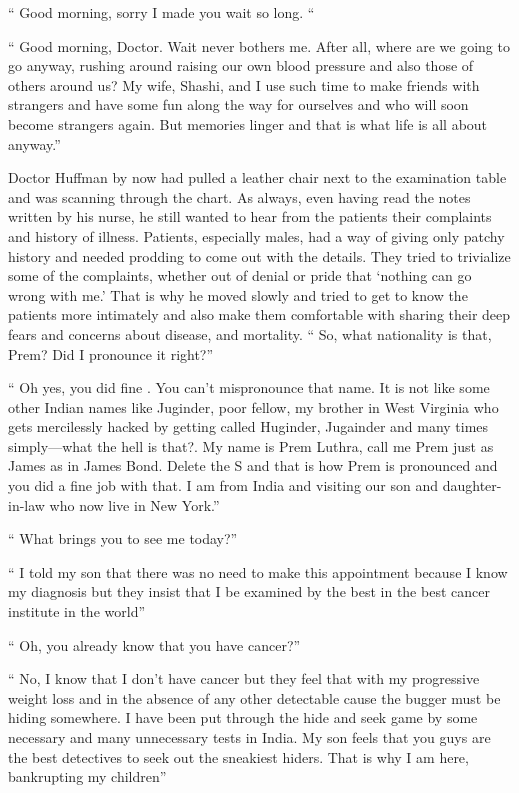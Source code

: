 `` Good morning, sorry I made you wait so long. ``

`` Good morning, Doctor. Wait never bothers me. After all, where are we
going to go anyway, rushing around raising our own blood pressure and
also those of others around us? My wife, Shashi, and I use such time to
make friends with strangers and have some fun along the way for
ourselves and who will soon become strangers again. But memories linger
and that is what life is all about anyway.''

Doctor Huffman by now had pulled a leather chair next to the examination
table and was scanning through the chart. As always, even having read
the notes written by his nurse, he still wanted to hear from the
patients their complaints and history of illness. Patients, especially
males, had a way of giving only patchy history and needed prodding to
come out with the details. They tried to trivialize some of the
complaints, whether out of denial or pride that `nothing can go wrong
with me.' That is why he moved slowly and tried to get to know the
patients more intimately and also make them comfortable with sharing
their deep fears and concerns about disease, and mortality. `` So, what
nationality is that, Prem? Did I pronounce it right?''

`` Oh yes, you did fine . You can't mispronounce that name. It is not
like some other Indian names like Juginder, poor fellow, my brother in
West Virginia who gets mercilessly hacked by getting called Huginder,
Jugainder and many times simply---what the hell is that?. My name is
Prem Luthra, call me Prem just as James as in James Bond. Delete the S
and that is how Prem is pronounced and you did a fine job with that. I
am from India and visiting our son and daughter-in-law who now live in
New York.''

`` What brings you to see me today?''

`` I told my son that there was no need to make this appointment because
I know my diagnosis but they insist that I be examined by the best in
the best cancer institute in the world''

`` Oh, you already know that you have cancer?''

`` No, I know that I don't have cancer but they feel that with my
progressive weight loss and in the absence of any other detectable cause
the bugger must be hiding somewhere. I have been put through the hide
and seek game by some necessary and many unnecessary tests in India. My
son feels that you guys are the best detectives to seek out the
sneakiest hiders. That is why I am here, bankrupting my children''

